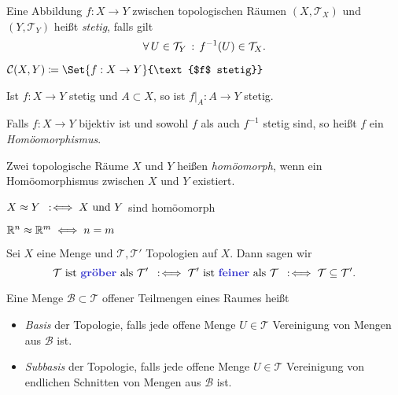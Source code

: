 \documentclass{cheat-sheet}
\newcommand{\Tau}{\mathcal{T}} %
\begin{document}
\begin{defn}
  Eine Abbildung $f : X \to Y$ zwischen topologischen Räumen $(X, \Tau_X)$ und $(Y, \Tau_Y)$ heißt \emph{stetig}, falls gilt
  \[ \fa{U \in \Tau_Y} f^{-1}(U) \in \Tau_X. \]
\end{defn}

\begin{nota}
  $\mathcal{C}(X, Y) \coloneqq \Set{ f : X \to Y }{\text{$f$ stetig}}$
\end{nota}

\begin{bem}
  Ist $f : X \to Y$ stetig und $A \!\subset\! X$, so ist $f|_A : A \to Y$ stetig.
\end{bem}

\begin{defn}
  Falls $f : X \to Y$ bijektiv ist und sowohl $f$ als auch $f^{-1}$ stetig sind, so heißt $f$ ein \emph{Homöomorphismus}.
\end{defn}

\begin{defn}
  Zwei topologische Räume $X$ und $Y$ heißen \emph{homöomorph}, wenn ein Homöomorphismus zwischen $X$ und $Y$ existiert.
\end{defn}

\begin{nota}
  $X \approx Y \enspace:\!\iff X \text{ und } Y$ sind homöomorph
\end{nota}

\begin{satz}
  $\mathbb{R}^n \approx \mathbb{R}^m \iff n = m$
\end{satz}

\begin{defn}
  Sei $X$ eine Menge und $\Tau, \Tau'$ Topologien auf $X$. Dann sagen wir
  \[ \Tau \text{ ist \emph{gröber} als } \Tau' \coloniff \Tau' \text{ ist \emph{feiner} als } \Tau \coloniff \Tau \subseteq \Tau'. \]
\end{defn}


\begin{defn}
  Eine Menge $\mathcal{B} \subset \Tau$ offener Teilmengen eines Raumes heißt
  \begin{itemize}
    \item \emph{Basis} der Topologie, falls jede offene Menge $U \in \Tau$ Vereinigung von Mengen aus $\mathcal{B}$ ist.
    \item \emph{Subbasis} der Topologie, falls jede offene Menge $U \in \Tau$ Vereinigung
    von endlichen Schnitten von Mengen aus $\mathcal{B}$ ist.
  \end{itemize}
\end{defn}
\end{document}
